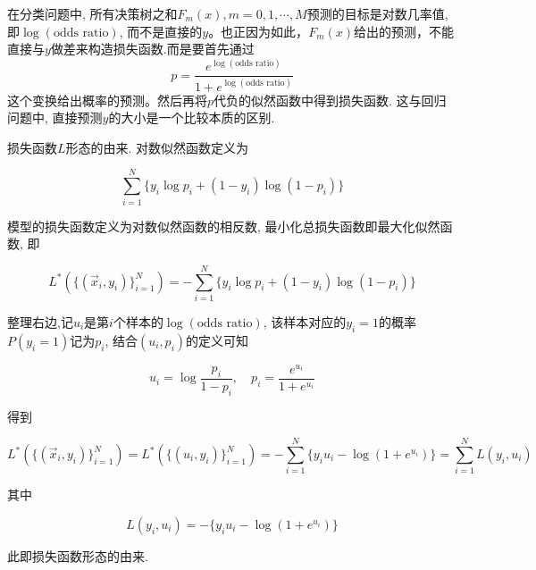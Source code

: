 \begin{remark}
    在分类问题中, 所有决策树之和$F_m(x), m=0,1,\cdots, M$预测的目标是对数几率值, 即$\log(\text{odds ratio})$, 而不是直接的$y$。也正因为如此，$F_m(x)$给出的预测，不能直接与$y$做差来构造损失函数.而是要首先通过
    \begin{equation*}
        p = \frac{e^{\log(\text{odds ratio})}}{1 + e^{\log(\text{odds ratio})}}
    \end{equation*}
    这个变换给出概率的预测。然后再将$p$代负的似然函数中得到损失函数. 这与回归问题中, 直接预测$y$的大小是一个比较本质的区别.
\end{remark}

\begin{remark}
    损失函数$L$形态的由来. 对数似然函数定义为

    \begin{equation*}
        \sum_{i=1}^N\Big\{y_i\log p_i + (1 - y_i)\log (1 - p_i)\Big\}
    \end{equation*}

    模型的损失函数定义为对数似然函数的相反数, 最小化总损失函数即最大化似然函数, 即

    \begin{equation*}
        L^*(\{(\vec{x}_i, y_i)\}_{i=1}^N) = -\sum_{i=1}^N\Big\{y_i\log p_i + (1 - y_i)\log (1 - p_i)\Big\}
    \end{equation*}

    整理右边,记$u_i$是第$i$个样本的$\log(\text{odds ratio})$, 该样本对应的$y_i=1$的概率$P(y_i=1)$记为$p_i$, 结合$(u_i, p_i)$的定义可知

    \begin{equation*}
        u_i = \log\frac{p_i}{1 - p_i},\quad p_i = \frac{e^{u_i}}{1 + e^{u_i}}
    \end{equation*}

    得到

    \begin{equation*}
        L^*(\{(\vec{x}_i, y_i)\}_{i=1}^N) = L^*(\{(u_i, y_i)\}_{i=1}^N) = -\sum_{i=1}^N\Big\{y_iu_i - \log(1 + e^{u_i}) \Big\} = \sum_{i=1}^NL(y_i,u_i)
    \end{equation*}

    其中

    \begin{equation*}
        L(y_i, u_i) = -\Big\{y_iu_i - \log(1 + e^{u_i})\Big\}
    \end{equation*}
    
    此即损失函数形态的由来.

\end{remark}
    
